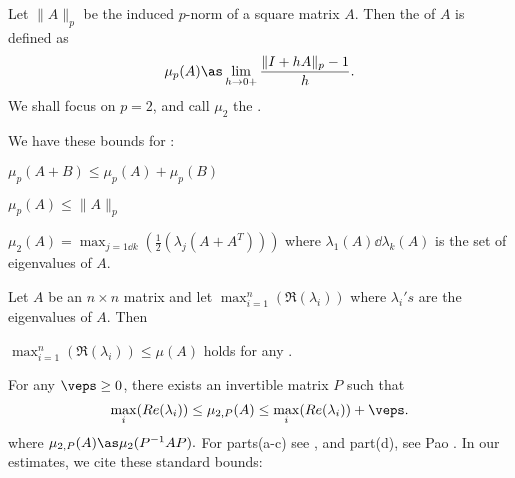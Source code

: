 	Let $\|A\|_p$ be the induced $p$-norm of a square matrix $A$.
	Then the  of $A$ is defined as
		\[\mu_p(A) \as \lim_{h\to 0+}\frac{\|I+hA\|_p-1}{h}.\]
	We shall focus on $p=2$, and call $\mu_2$ the \lognorm.
	
	
	We have these bounds for \lognorm:
	\bleml[lognorm] \ 
	\benum[(a)]
	\item
		$\mu_p(A+B)\le \mu_p(A)+\mu_p(B)$
	\item
		$\mu_p(A)\le \|A\|_p$
	\item
		$\mu_2(A)=\max_{j=1\dd k}(\frac{1}{2}(\lambda_{j} (A+A^T)))$
			where $\lambda_1(A)\dd \lambda_k(A)$
			is the set of eigenvalues of $A$.
	\item
		Let $A$ be an $n\times n$ matrix  and let
		$\max_{i=1}^n (\Re(\lambda_i))$ where
		$\lambda_i's$ are the eigenvalues of $A$.
		Then
		\bitem
			\item $\max_{i=1}^n (\Re(\lambda_i))\le
					\mu(A)$ holds for any \lognorm.
			\item For any $\veps \ge 0$, there exists an
				invertible matrix $P$ such that 
			\[\max_i(Re(\lambda_i))\le \mu_{2,P}(A)\le
				\max_i(Re(\lambda_i))+\veps.\]
			where $\mu_{2,P}(A)\as \mu_2(P^{-1}AP).$
		\eitem
	\eenum
	\eleml
	For parts(a-c) see
		\cite{desoer-haneda:measure:72},
	and part(d), see
		Pao \cite{pao:log-der-matrix:73}.
	In our estimates, we cite these standard bounds:
	\eeql

